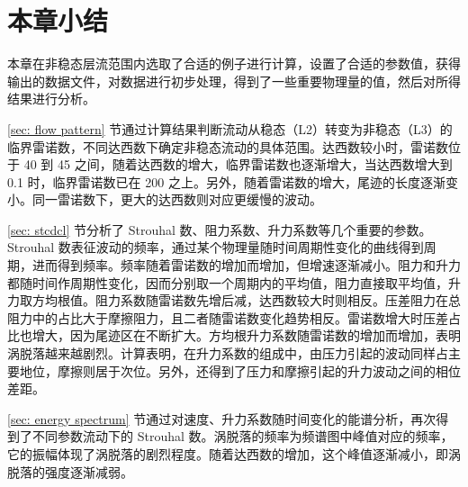 
\section{本章小结}

本章在非稳态层流范围内选取了合适的例子进行计算，设置了合适的参数值，获得输出的数据文件，对数据进行初步处理，得到了一些重要物理量的值，然后对所得结果进行分析。

\ref{sec: flow pattern} 节通过计算结果判断流动从稳态（L2）转变为非稳态（L3）的临界雷诺数，不同达西数下确定非稳态流动的具体范围。达西数较小时，雷诺数位于 40 到 45 之间，随着达西数的增大，临界雷诺数也逐渐增大，当达西数增大到 0.1 时，临界雷诺数已在 200 之上。另外，随着雷诺数的增大，尾迹的长度逐渐变小。同一雷诺数下，更大的达西数则对应更缓慢的波动。

\ref{sec: stcdcl} 节分析了 Strouhal 数、阻力系数、升力系数等几个重要的参数。Strouhal 数表征波动的频率，通过某个物理量随时间周期性变化的曲线得到周期，进而得到频率。频率随着雷诺数的增加而增加，但增速逐渐减小。阻力和升力都随时间作周期性变化，因而分别取一个周期内的平均值，阻力直接取平均值，升力取方均根值。阻力系数随雷诺数先增后减，达西数较大时则相反。压差阻力在总阻力中的占比大于摩擦阻力，且二者随雷诺数变化趋势相反。雷诺数增大时压差占比也增大，因为尾迹区在不断扩大。方均根升力系数随雷诺数的增加而增加，表明涡脱落越来越剧烈。计算表明，在升力系数的组成中，由压力引起的波动同样占主要地位，摩擦则居于次位。另外，还得到了压力和摩擦引起的升力波动之间的相位差距。

\ref{sec: energy spectrum} 节通过对速度、升力系数随时间变化的能谱分析，再次得到了不同参数流动下的 Strouhal 数。涡脱落的频率为频谱图中峰值对应的频率，它的振幅体现了涡脱落的剧烈程度。随着达西数的增加，这个峰值逐渐减小，即涡脱落的强度逐渐减弱。
